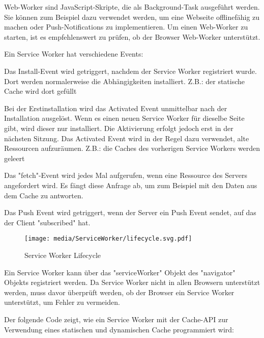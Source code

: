 

Web-Worker sind JavaScript-Skripte, die als Background-Task ausgeführt werden. Sie können zum Beispiel dazu verwendet werden, um eine Webseite offlinefähig zu machen oder Push-Notifications zu implementieren.  Um einen Web-Worker zu starten, ist es empfehlenswert zu prüfen, ob der Browser Web-Worker unterstützt.


Ein Service Worker hat verschiedene Events: 


Das Install-Event wird getriggert, nachdem der Service Worker registriert wurde. Dort werden normalerweise die Abhängigkeiten installiert. Z.B.: der statische Cache wird dort gefüllt 


Bei der Erstinstallation wird das Activated Event unmittelbar nach der Installation ausgelöst. Wenn es einen neuen Service Worker für dieselbe Seite gibt, wird dieser nur installiert. Die Aktivierung erfolgt jedoch erst in der nächsten Sitzung. Das Activated Event wird in der Regel dazu verwendet, alte Ressourcen aufzuräumen. Z.B.: die Caches des vorherigen Service Workers werden geleert


Das "fetch"-Event wird jedes Mal aufgerufen, wenn eine Ressource des Servers angefordert wird. Es fängt diese Anfrage ab, um zum Beispiel mit den Daten aus dem Cache zu antworten.


Das Push Event wird getriggert, wenn der Server ein Push Event sendet, auf das der Client "subscribed" hat.

\begin{figure}[h]
    \centering
    \texttt{[image: media/ServiceWorker/lifecycle.svg.pdf]}
    \caption{Service Worker Lifecycle}
    \cite{MDNCacheAPI}
\end{figure}


Ein Service Worker kann über das "serviceWorker" Objekt des "navigator" Objekts registriert werden. Da Service Worker nicht in allen Browsern unterstützt werden, muss davor überprüft werden, ob der Browser ein Service Worker unterstützt, um Fehler zu vermeiden.

\pagebreak

\label{sec:cacheImpl}

Der folgende Code zeigt, wie ein Service Worker mit der Cache-API zur Verwendung eines statischen und dynamischen Cache programmiert wird:

